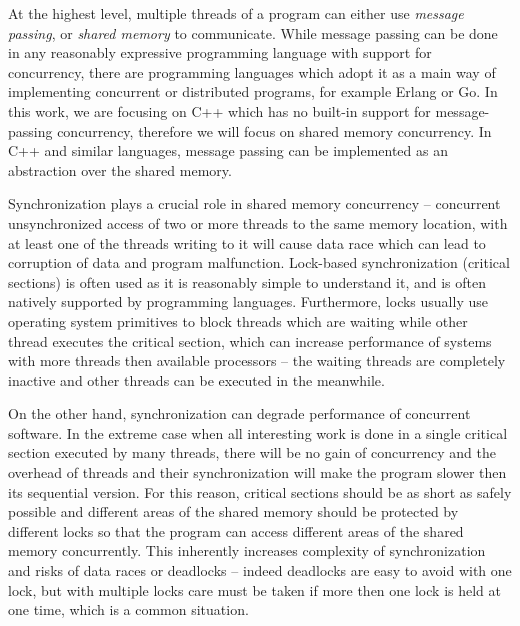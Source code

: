 At the highest level, multiple threads of a program can either use
\emph{message passing}, or \emph{shared memory} to communicate.
While message passing can be done in any reasonably expressive programming
language with support for concurrency, there are programming languages which
adopt it as a main way of implementing concurrent or distributed programs, for
example Erlang or Go.
In this work, we are focusing on C++ which has no built-in support for message-passing concurrency, therefore
we will focus on shared memory concurrency.
In C++ and similar languages, message passing can be implemented as an
abstraction over the shared memory.

Synchronization plays a crucial role in shared memory concurrency -- concurrent
unsynchronized access of two or more threads to the same memory location, with
at least one of the threads writing to it will cause data race which can lead
to corruption of data and program malfunction.
Lock-based synchronization (critical sections) is often used as it is
reasonably simple to understand it, and is often natively supported by
programming languages.
Furthermore, locks usually use operating system primitives to block threads
which are waiting while other thread executes the critical section, which can
increase performance of systems with more threads then available processors --
the waiting threads are completely inactive and other threads can be executed
in the meanwhile.

On the other hand, synchronization can degrade performance of concurrent
software.
In the extreme case when all interesting work is done in a single critical
section executed by many threads, there will be no gain of concurrency and the
overhead of threads and their synchronization will make the program slower then
its sequential version.
For this reason, critical sections should be as short as safely possible and
different areas of the shared memory should be protected by different locks so
that the program can access different areas of the shared memory concurrently.
This inherently increases complexity of synchronization and risks of data races
or deadlocks -- indeed deadlocks are easy to avoid with one lock, but with
multiple locks care must be taken if more then one lock is held at one time,
which is a common situation.

